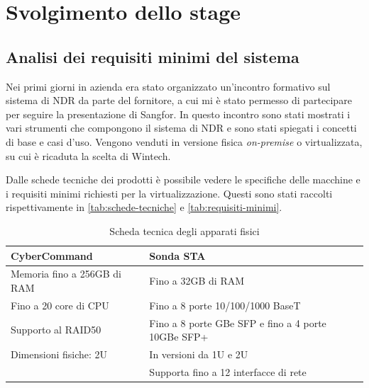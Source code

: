 \chapter{Svolgimento dello stage}
\label{cap:svolgimento}


\section{Analisi dei requisiti minimi del sistema}
\label{sez:requisiti}

Nei primi giorni in azienda era stato organizzato un'incontro formativo sul sistema di NDR da parte del fornitore, a cui mi è stato permesso di partecipare per seguire la presentazione di Sangfor. In questo incontro sono stati mostrati i vari strumenti che compongono il sistema di NDR e sono stati spiegati i concetti di base e casi d'uso. Vengono venduti in versione fisica \emph{on-premise} o virtualizzata, su cui è ricaduta la scelta di Wintech.

Dalle schede tecniche dei prodotti è possibile vedere le specifiche delle macchine e i requisiti minimi richiesti per la virtualizzazione. Questi sono stati raccolti rispettivamente in \autoref{tab:schede-tecniche} e \autoref{tab:requisiti-minimi}.

\begin{table}[!htbp]
    \centering
    \begin{tabularx}{\linewidth}{XX}
        \toprule
        \textbf{CyberCommand} & \textbf{Sonda STA} \\
        \midrule
        Memoria fino a 256GB di RAM & Fino a 32GB di RAM \\
        Fino a 20 core di CPU & Fino a 8 porte 10/100/1000 BaseT \\
        Supporto al RAID50 & Fino a 8 porte GBe SFP e fino a 4 porte 10GBe SFP+ \\
        Dimensioni fisiche: 2U & In versioni da 1U e 2U \\
            & Supporta fino a 12 interfacce di rete \\
        \bottomrule
    \end{tabularx}
    \caption{Scheda tecnica degli apparati fisici}
    \label{tab:schede-tecniche}
\end{table}

